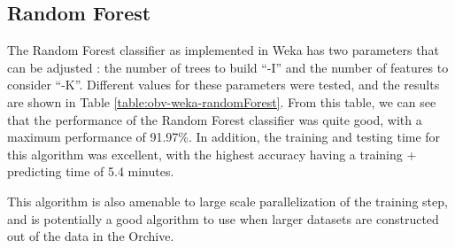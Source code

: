 \documentclass[12pt,oneside]{book}
\begin{document}
%
%
\subsection{Random Forest}

The Random Forest classifier as implemented in Weka has two parameters
that can be adjusted : the number of trees to build ``-I'' and the
number of features to consider ``-K''.  Different values for these
parameters were tested, and the results are shown in Table
\ref{table:obv-weka-randomForest}.  From this table, we can see that
the performance of the Random Forest classifier was quite good, with a
maximum performance of 91.97\%.  In addition, the training and testing
time for this algorithm was excellent, with the highest accuracy
having a training + predicting time of 5.4 minutes.

This algorithm is also amenable to large scale parallelization of the
training step, and is potentially a good algorithm to use when larger
datasets are constructed out of the data in the Orchive.
\end{document}
